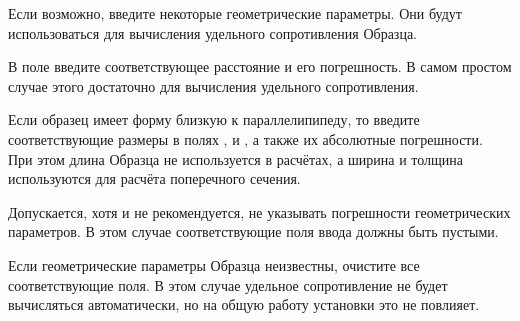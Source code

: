 Если возможно, введите некоторые геометрические параметры. Они будут использоваться для вычисления удельного сопротивления Образца. 

В поле  введите соответствующее расстояние и его погрешность. В самом простом случае этого достаточно для вычисления удельного сопротивления.

Если образец имеет форму близкую к параллелипипеду, то введите соответствующие размеры в полях ,  и , а также их абсолютные погрешности. При этом длина Образца не используется в расчётах, а ширина и толщина используются для расчёта поперечного сечения.

Допускается, хотя и не рекомендуется, не указывать погрешности геометрических параметров. В этом случае соответствующие поля ввода должны быть пустыми.

Если геометрические параметры Образца неизвестны, очистите все соответствующие поля. В этом случае удельное сопротивление не будет вычисляться автоматически, но на общую работу установки это не повлияет.
